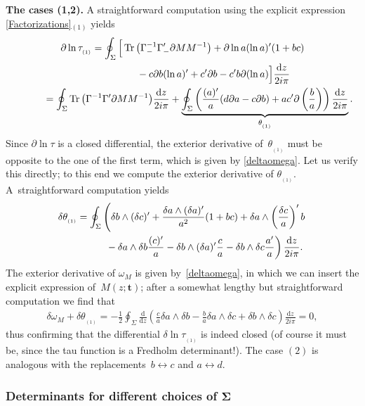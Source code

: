 \documentclass[pdftex]{sigma}
\numberwithin{equation}{section}
\def \ddz{ \frac {\d z}{2i\pi}}
\def \G{\Gamma}
\def \pa{\partial}
\def\d{\mathrm d}
\def \t{\mathbf t}
\begin{document}
{\bf The cases (1,2).}
A straightforward computation using the explicit expression \eqref{Factorizations}$_{(1)}$ yields
\begin{gather}
\pa \ln \tau_{_{(1)}} = \oint_{\Sigma} \Big[\operatorname{Tr} \big(\G_-^{-1} \G_-' \pa M M^{-1} \big) + \pa \ln a (\ln a)' (1 + bc)\nonumber\\
\hphantom{\pa \ln \tau_{_{(1)}} = \oint_{\Sigma} \Big[}{}
 - c \pa b (\ln a)' + c' \pa b - c' b\pa(\ln a)\Big]\ddz\nonumber \\
\hphantom{\pa \ln \tau_{_{(1)}}}{}
 = \oint_{\Sigma} \operatorname{Tr} \big(\G^{-1} \G' \pa M M^{-1} \big) \frac {\d z}{2i\pi}
 + \underbrace{\oint_{\Sigma} \left( \frac {(a)'}{a}(d \pa a - c \pa b )+ { a c'} \pa \left(\frac b a\right)\right)\frac {\d z}{2i\pi}
}_{\theta_{_{(1)}}}.\label{theta}
\end{gather}
Since $\pa \ln \tau$ is a closed dif\/ferential, the exterior derivative of~$\theta_{_{(1)}}$ must be opposite to the one of the f\/irst term, which is given by \eqref{deltaomega}. Let us verify this directly; to this end we compute the exterior derivative of $\theta_{_{(1)}}$. A~straightforward computation yields
\begin{gather*}
\delta \theta_{_{(1)}}= \oint_{\Sigma}
\left(\delta b \wedge (\delta c)' + \frac{ \delta a \wedge (\delta a)' }{a^2} (1 + bc)
+\delta a \wedge \left(\frac {\delta c}a\right)' {b}\right.\\
\left. \hphantom{\delta \theta_{_{(1)}}= \oint_{\Sigma}}{}
-\delta a \wedge \delta b \frac {(c)'}a-\delta b\wedge (\delta a)' \frac {c}{a}-\delta b \wedge \delta c \frac{ a'}{a} \right)\ddz.
\end{gather*}
The exterior derivative of $\omega_M$ is given by~\eqref{deltaomega}, in which we can insert the explicit expression of~$M(z;\t)$; after a somewhat lengthy but straightforward computation we f\/ind that
\begin{gather*}
\delta \omega_M + \delta \theta_{_{(1)}} = -\frac 1 2 \oint_{\Sigma}\frac {\d}{\d z}\left(\frac { c} a \delta a \wedge \delta b
-\frac {b}{a} \delta a \wedge \delta c + \delta b\wedge \delta c \right)\ddz = 0,
\end{gather*}
thus conf\/irming that the dif\/ferential $\delta \ln \tau_{_{(1)}}$ is indeed closed (of course it must be, since the tau function is a Fredholm determinant!). The case ${(2)}$ is analogous with the replacements~$b\leftrightarrow c$ and $a\leftrightarrow d$.

\subsubsection[Determinants for dif\/ferent choices of $\Sigma$]{Determinants for dif\/ferent choices of $\boldsymbol{\Sigma}$}
\end{document}
